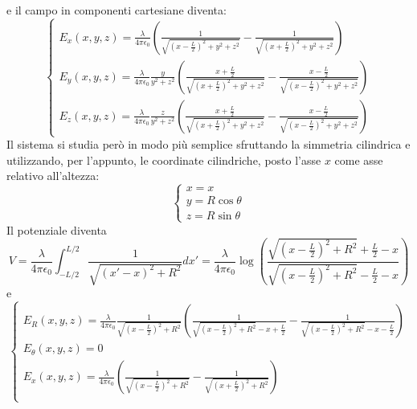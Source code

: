 	e il campo in componenti cartesiane diventa:
	\begin{equation*}
		\begin{cases}
			E_x(x,y,z)=\frac{\lambda}{4\pi\epsilon_0}\left(\frac{1}{\sqrt{\left(x-\frac{L}{2}\right)^2+y^2+z^2}}-\frac{1}{\sqrt{\left(x+\frac{L}{2}\right)^2+y^2+z^2}}\right)\\
			E_y(x,y,z)=\frac{\lambda}{4\pi\epsilon_0}\frac{y}{y^2+z^2}\left(\frac{x+\frac{L}{2}}{\sqrt{\left(x+\frac{L}{2}\right)^2+y^2+z^2}}-\frac{x-\frac{L}{2}}{\sqrt{\left(x-\frac{L}{2}\right)^2+y^2+z^2}}\right)\\
			E_z(x,y,z)=\frac{\lambda}{4\pi\epsilon_0}\frac{z}{y^2+z^2}\left(\frac{x+\frac{L}{2}}{\sqrt{\left(x+\frac{L}{2}\right)^2+y^2+z^2}}-\frac{x-\frac{L}{2}}{\sqrt{\left(x-\frac{L}{2}\right)^2+y^2+z^2}}\right)
		\end{cases}
	\end{equation*}
	Il sistema si studia però in modo più semplice sfruttando la simmetria cilindrica e utilizzando, per l'appunto, le coordinate cilindriche, posto l'asse $x$ come asse relativo all'altezza:
	\begin{equation*}
		\begin{cases}
			x=x\\
			y=R\cos\theta\\
			z=R\sin\theta
		\end{cases}
	\end{equation*}
	Il potenziale diventa
	\begin{equation}
		V=\frac{\lambda}{4\pi\epsilon_0}\int_{-L/2}^{L/2}\frac{1}{\sqrt{(x'-x)^2+R^2}}dx'=\frac{\lambda}{4\pi\epsilon_0}\log\left(\frac{\sqrt{\left(x-\frac{L}{2}\right)^2+R^2}+\frac{L}{2}-x}{\sqrt{\left(x-\frac{L}{2}\right)^2+R^2}-\frac{L}{2}-x}\right)
	\end{equation}
	e 
	\begin{equation*}
		\begin{cases}
			E_R(x,y,z)=\frac{\lambda}{4\pi\epsilon_0}\frac{1}{\sqrt{\left(x-\frac{L}{2}\right)^2+R^2}}\left(\frac{1}{\sqrt{\left(x-\frac{L}{2}\right)^2+R^2}-x+\frac{L}{2}}-\frac{1}{\sqrt{\left(x-\frac{L}{2}\right)^2+R^2}-x-\frac{L}{2}}\right)\\
			E_\theta(x,y,z)=0\\
			E_x(x,y,z)=\frac{\lambda}{4\pi\epsilon_0}\left(\frac{1}{\sqrt{\left(x-\frac{L}{2}\right)^2+R^2}}-\frac{1}{\sqrt{\left(x+\frac{L}{2}\right)^2+R^2}}\right)\\
		\end{cases}
	\end{equation*}
